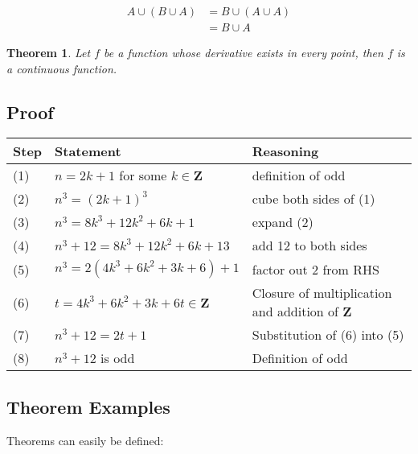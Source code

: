 \documentclass{article}
\newtheorem{theorem}{Theorem}[section] %
\theoremstyle{definition}
\theoremstyle{remark}
\begin{document}
        
        \begin{equation}\label{eq2}\begin{split}
            A\cup(B\cup A) & =B \cup(A\cup A) \\
            & = B \cup A
        \end{split}\end{equation}


\begin{theorem}
Let \(f\) be a function whose derivative exists in every point, then \(f\) 
is a continuous function.
\end{theorem}








\subsection{Proof}

    \begin{tabular}{ll|l}
    Step & Statement & Reasoning \\ \hline
    (1) & $n = 2k + 1$ for some $k \in \mathbf{Z}$ & definition of odd\\
    (2) & $n^3 = (2k+1)^3$ & cube both sides of (1)\\
    (3) & $n^3 = 8k^3 + 12k^2 + 6k + 1$ & expand (2)\\
    (4) & $n^3 + 12 = 8k^3 + 12k^2 + 6k + 13$ & add 12 to both sides\\
    (5) & $n^3 = 2(4k^3 + 6k^2 + 3k + 6) + 1$ & factor out 2 from RHS\\
    (6) & $t = 4k^3 + 6k^2 + 3k + 6 t \in \mathbf{Z}$ & Closure of multiplication and addition of $\mathbf{Z}$ \\
    (7) & $n^3 + 12 = 2t + 1$ & Substitution of (6) into (5)\\
    (8) & $n^3 + 12$ is odd & Definition of odd\\
    \end{tabular}






\subsection{Theorem Examples}
Theorems can easily be defined:
\end{document}
